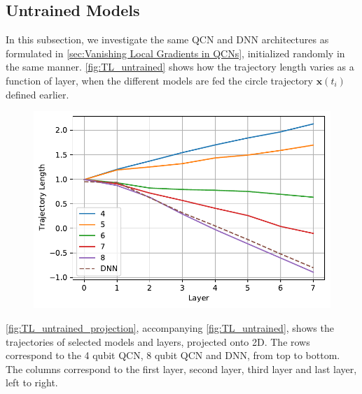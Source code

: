 \subsection{Untrained Models}\label{sec:Untrained Models}

In this subsection, we investigate the same QCN and DNN architectures as formulated in \autoref{sec:Vanishing Local Gradients in QCNs}, initialized randomly in the same manner. \autoref{fig:TL_untrained} shows how the trajectory length varies as a function of layer, when the different models are fed the circle trajectory $\boldsymbol{x}(t_i)$ defined earlier.


\begin{figure}[H]
    \centering
    \includegraphics[width=12cm]{latex/figures/TL_untrained.pdf}
    \caption{}
    \label{fig:TL_untrained}
\end{figure}

\autoref{fig:TL_untrained_projection}, accompanying \autoref{fig:TL_untrained}, shows the trajectories of selected models and layers, projected onto 2D. The rows correspond to the 4 qubit QCN, 8 qubit QCN and DNN, from top to bottom. The columns correspond to the first layer, second layer, third layer and last layer, left to right.   

